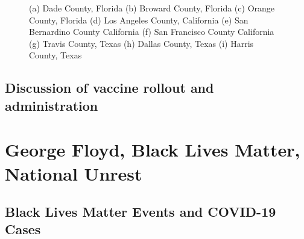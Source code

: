 \documentclass[]{article}
\begin{document}
\begin{figure}
	\caption{(a) Dade County, Florida (b) Broward County, Florida (c) Orange County, Florida (d) Los Angeles County, California (e) San Bernardino County California (f) San Francisco County California (g) Travis County, Texas (h) Dallas County, Texas (i) Harris County, Texas}
	\label{fig:foobar}
\end{figure}
\FloatBarrier
\vspace{5mm}

\subsection{Discussion of vaccine rollout and administration}

\vspace{5mm}

\section{George Floyd, Black Lives Matter, National Unrest}


\subsection{Black Lives Matter Events and COVID-19 Cases}
\end{document}
